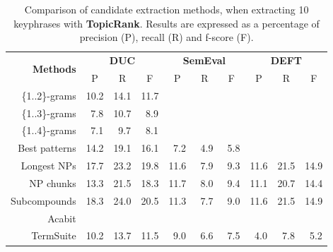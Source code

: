     \begin{table}[h]
      \centering
      \begin{tabular}{rccccccccc}
        \toprule
        \multirow{2}{*}[-2pt]{\textbf{Methods}} & \multicolumn{3}{c}{\textbf{DUC}} & \multicolumn{3}{c}{\textbf{SemEval}} & \multicolumn{3}{c}{\textbf{DEFT}}\\
        \cmidrule(r){2-4}\cmidrule(lr){5-7}\cmidrule(l){8-10}
        & P & R & F & P & R & F & P & R & F\\
        \midrule
        \{1..2\}-grams & 10.2 & 14.1 & 11.7 & & & & & & \\
        \{1..3\}-grams & $~~$7.8 & 10.7 & $~~$8.9 & & & & & & \\
        \{1..4\}-grams & $~~$7.1 & $~~$9.7 & $~~$8.1 & & & & & & \\
        Best patterns & 14.2 & 19.1 & 16.1 & $~~$7.2 & $~~$4.9 & $~~$5.8 & & & \\
        Longest NPs & 17.7 & 23.2 & 19.8 & 11.6 & $~~$7.9 & $~~$9.3 & 11.6 & 21.5 & 14.9\\
        NP chunks & 13.3 & 21.5 & 18.3 & 11.7 & $~~$8.0 & $~~$9.4 & 11.1 & 20.7 & 14.4\\
        Subcompounds & 18.3 & 24.0 & 20.5 & 11.3 & $~~$7.7 & $~~$9.0 & 11.6 & 21.5 & 14.9\\
        Acabit & & & & & & & & & \\
        TermSuite & 10.2 & 13.7 & 11.5 & $~~$9.0 & $~~$6.6 & $~~$7.5 & $~~$4.0 & $~~$7.8 & $~~$5.2\\
        \bottomrule
      \end{tabular}
      \caption{Comparison of candidate extraction methods, when extracting 10
               keyphrases with \textbf{TopicRank}. Results are expressed as a
               percentage of precision (P), recall (R) and f-score (F).
               \label{tab:keyphrase_extraction_results}}
    \end{table}

